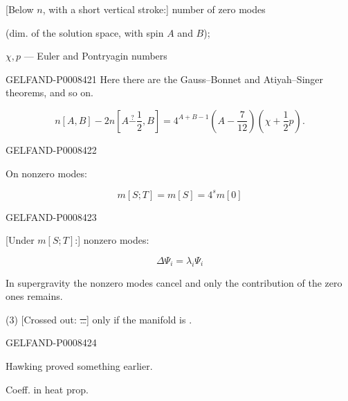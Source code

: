 [Below \(n\), with a short vertical stroke:] number of zero modes

(dim. of the solution space, with spin \(A\) and \(B\));

\(\chi,p\) — Euler and Pontryagin numbers


\begin{GelfandAdjacentEvidence}{GELFAND-P000842}{1}
Here there are the Gauss–Bonnet and Atiyah–Singer theorems, and so on.

\begin{equation*}
n[A,B]-2n\left[A\overset{?}{-}\frac12,B\right]
=4^{A+B-1}\left(A-\frac7{12}\right)\left(\chi+\frac12p\right).
\tag{3}
\end{equation*}
\end{GelfandAdjacentEvidence}
\begin{GelfandAdjacentEvidence}{GELFAND-P000842}{2}


On nonzero modes:

\begin{equation*}
m[S;T]=m[S]=4^s m[0]
\tag{4}
\end{equation*}
\end{GelfandAdjacentEvidence}
\begin{GelfandAdjacentEvidence}{GELFAND-P000842}{3}


[Under \(m[S;T]\):] nonzero modes:

\begin{equation*}
\Delta\Psi_i=\lambda_i\Psi_i
\tag{5}
\end{equation*}

In supergravity the nonzero modes cancel and only the contribution of the zero ones remains.

(3) [Crossed out: \sout{…}] only if the manifold is .
\end{GelfandAdjacentEvidence}
\begin{GelfandAdjacentEvidence}{GELFAND-P000842}{4}


Hawking proved something earlier.

Coeff. in heat prop.
\end{GelfandAdjacentEvidence}
